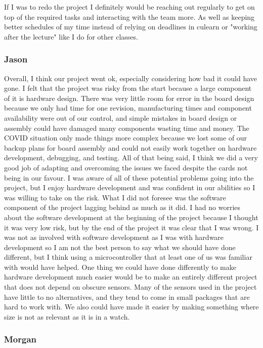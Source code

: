 If I was to redo the project I definitely would be reaching out regularly to get on top of
the required tasks and interacting with the team more. As well as keeping better schedules of my time
instead of relying on deadlines in culearn or "working after the lecture" like I do for other classes.

\subsubsection{Jason}

Overall, I think our project went ok, especially considering how bad it could
have gone. I felt that the project was risky from the start because a large
component of it is hardware design. There was very little room for error in the
board design because we only had time for one revision, manufacturing times
and component availability were out of our control, and simple mistakes in board 
design or assembly could have damaged many components wasting time and money. 
The COVID situation only made things more complex because we lost some of our 
backup plans for board assembly and could not easily work together on hardware 
development, debugging, and testing. All of that being said, I think we did a 
very good job of adapting and overcoming the issues we faced despite the cards 
not being in our favour. I was aware of all of these potential problems going
into the project, but I enjoy hardware development and was confident in our 
abilities so I was willing to take on the risk. What I did not foresee was the
software component of the project lagging behind as much as it did. I had no
worries about the software development at the beginning of the project 
because I thought it was very low risk, but by the end of the project it was
clear that I was wrong. I was not as involved with software development as I was
with hardware development so I am not the best person to say what we should 
have done different, but I think using a microcontroller that at least one of us
was familiar with would have helped. One thing we could have done differently to 
make hardware development much easier would be to make an entirely different 
project that does not depend on obscure sensors. Many of the sensors used in the 
project have little to no alternatives, and they tend to come in small packages 
that are hard to work with. We also could have made it easier by making 
something where size is not as relevant as it is in a watch.

\subsubsection{Morgan}

